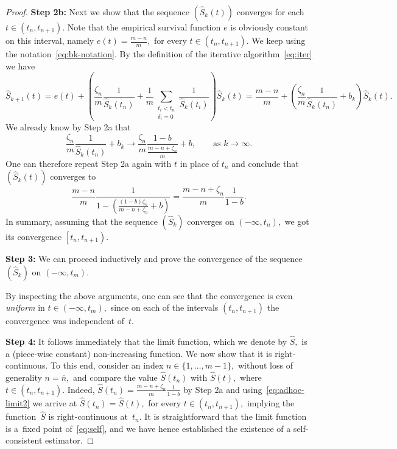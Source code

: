 \documentclass[10pt,a4paper]{amsart}
\renewcommand{\hat}{\widehat}
\def\l{\left}
\def\on{\overline{n}}
\def\r{\right}
\newcommand{\rec}[1]{\frac{1}{#1}}
\begin{document}
\begin{proof}
\textbf{Step 2b:} Next we show that the sequence $\l(\hat{S}_k(t)\r)$ converges for each $t\in\l(t_n,t_{n+1}\r).$ Note that the empirical survival function $e$ is obviously constant on this interval, namely $e(t)=\frac{m-n}{m},$ for every $t\in\l(t_n,t_{n+1}\r).$ We keep using the notation~\eqref{eq:bk-notation}. By the definition of the iterative algorithm~\eqref{eq:iter} we have
\begin{equation*} 
 \hat{S}_{k+1}(t) = e(t) + \l(\frac{\zeta_n}{m}\rec{\hat{S}_k\l(t_n\r)}+ \rec{m} \sum_{\substack{t_i< t_n \\ \delta_i=0}}\rec{\hat{S}_k\l(t_i\r)} \r) \hat{S}_k(t) = \frac{m-n}{m} + \l(\frac{\zeta_n}{m}\rec{\hat{S}_k\l(t_n\r)}+ b_k \r) \hat{S}_k(t) .
\end{equation*}
We already know by Step 2a that
\begin{equation*}
 \frac{\zeta_n}{m}\rec{\hat{S}_k\l(t_n\r)}+ b_k \to\frac{\zeta_n}{m} \frac{1-b}{\frac{m-n+\zeta_n}{m}}+b,\qquad \text{as } k\to\infty.
\end{equation*}
One can therefore repeat Step 2a again with $t$ in place of $t_n$ and conclude that $\l(\hat{S}_k(t)\r)$ converges to
\begin{equation} \label{eq:adhoc-limit2}
 \frac{m-n}{m}\rec{1-\l(\frac{(1-b)\zeta_n}{m-n+\zeta_n}+b\r)} = \frac{m-n+\zeta_n}{m}\rec{1-b}.
\end{equation}
In summary, assuming that the sequence $\l(\hat{S}_k\r)$ converges on $\l(-\infty,t_n\r),$ we got its convergence $\l[t_n,t_{n+1}\r).$

\textbf{Step 3:} We can proceed inductively and prove the convergence of the sequence $\l(\hat{S}_k\r)$ on $\l(-\infty,t_m\r).$ 

By inspecting the above arguments, one can see that the convergence is even \emph{uniform} in $t\in\l(-\infty,t_m\r),$ since on each of the intervals $\l(t_n,t_{n+1}\r)$ the convergence was independent of~$t.$

\textbf{Step 4:}  It follows immediately that the limit function, which we denote by $\hat{S},$ is a (piece-wise constant) non-increasing function. We now show that it is right-continuous. To this end, consider an index $n\in\{1,\dots, m-1\},$ without loss of generality $n=\on,$ and compare the value $\hat{S}\l(t_n\r)$ with $\hat{S}\l(t\r),$ where $t\in \l(t_n,t_{n+1}\r).$ Indeed, $\hat{S}\l(t_n\r)=\frac{m-n+\zeta_n}{m}\rec{1-b}$ by Step 2a and using~\eqref{eq:adhoc-limit2} we arrive at $\hat{S}\l(t_n\r)=\hat{S}(t),$ for every $t\in \l(t_n,t_{n+1}\r),$ implying the function~$\hat{S}$ is right-continuous at~$t_n.$ It is straightforward that the limit function is a~fixed point of~\eqref{eq:self}, and we have hence established the existence of a self-consistent estimator.


\end{proof}
\end{document}
